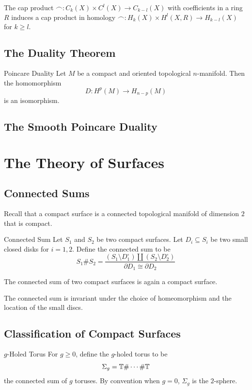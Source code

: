 \documentclass[a4paper]{article}
\begin{document}
\begin{lmm}{}{} The cap product $\frown: C_k(X)\times C^l(X)\to C_{k-l}(X)$ with coefficients in a ring $R$ induces a cap product in homology $\frown: H_k(X)\times H^l(X,R)\to H_{k-l}(X)$ for $k\geq l$. 
\end{lmm}

\subsection{The Duality Theorem}
\begin{thm}{Poincare Duality}{} Let $M$ be a compact and oriented topological $n$-manifold. Then the homomorphism $$D:H^p(M)\to H_{n-p}(M)$$ is an isomorphism. 
\end{thm}

\subsection{The Smooth Poincare Duality}

\pagebreak
\section{The Theory of Surfaces}
\subsection{Connected Sums}
Recall that a compact surface is a connected topological manifold of dimension $2$ that is compact. 

\begin{defn}{Connected Sum}{} Let $S_1$ and $S_2$ be two compact surfaces. Let $D_i\subseteq S_i$ be two small closed disks for $i=1,2$. Define the connected sum to be $$S_1\# S_2=\frac{(S_1\setminus D_1^\circ)\amalg(S_2\setminus D_2^\circ)}{\partial D_1\cong\partial D_2}$$
\end{defn}

\begin{lmm}{}{} The connected sum of two compact surfaces is again a compact surface. 
\end{lmm}

\begin{prp}{}{} The connected sum is invariant under the choice of homeomorphism and the location of the small discs. 
\end{prp}

\subsection{Classification of Compact Surfaces}
\begin{defn}{$g$-Holed Torus}{} For $g\geq 0$, define the $g$-holed torus to be $$\Sigma_g=\mathbb{T}\#\cdots\#\mathbb{T}$$ the connected sum of $g$ toruses. By convention when $g=0$, $\Sigma_g$ is the $2$-sphere. 
\end{defn}
\end{document}
